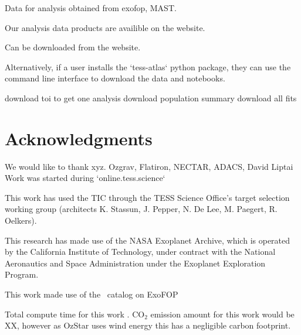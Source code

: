 \documentclass[floatfix,ApJL,twocolumn]{aastex631}
\begin{document}
Data for analysis obtained from exofop, MAST. 

Our analysis data products are availible on the website.

Can be downloaded from the website.

Alternatively, if a user installs the `tess-atlas` python package, they can use the command line interface to download the data and notebooks.

download toi to get one analysis
download population summary
download all fits





\section*{Acknowledgments}{

We would like to thank xyz.
Ozgrav, Flatiron, NECTAR, ADACS, David Liptai
Work was started during `online.tess.science`

This work has used the TIC through the TESS Science Office’s target selection working group (architects K. Stassun, J. Pepper, N. De Lee, M. Paegert, R. Oelkers).

This research has made use of the NASA Exoplanet Archive, which is operated by the California Institute of Technology, under contract with the National Aeronautics and Space Administration under the Exoplanet Exploration Program.

This work made use of the \tess\ catalog on ExoFOP

Total compute time for this work \red{\cpuHrs} . CO$_2$ emission amount for this work would be XX, however as OzStar uses wind energy this has a negligible carbon footprint.

}

\vspace{5mm}



{}


\appendix
\end{document}
